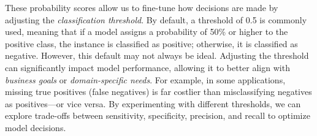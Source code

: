 \documentclass[
  11pt,
]{book}
\theoremstyle{definition}
\theoremstyle{definition}
\theoremstyle{definition}
\theoremstyle{definition}
\theoremstyle{remark}
\begin{document}
These probability scores allow us to fine-tune how decisions are made by adjusting the \emph{classification threshold}. By default, a threshold of 0.5 is commonly used, meaning that if a model assigns a probability of 50\% or higher to the positive class, the instance is classified as positive; otherwise, it is classified as negative. However, this default may not always be ideal. Adjusting the threshold can significantly impact model performance, allowing it to better align with \emph{business goals} or \emph{domain-specific needs}. For example, in some applications, missing true positives (false negatives) is far costlier than misclassifying negatives as positives---or vice versa. By experimenting with different thresholds, we can explore trade-offs between sensitivity, specificity, precision, and recall to optimize model decisions.
\end{document}

